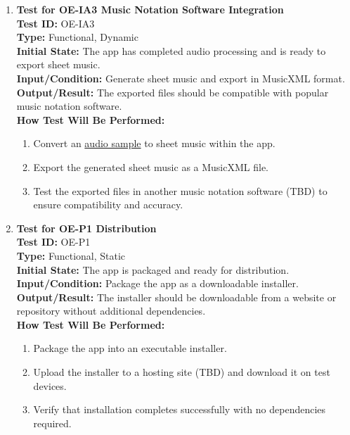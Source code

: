 \documentclass[12pt, titlepage]{article}
\begin{document}
\begin{enumerate}
    \item \textbf{Test for OE-IA3 Music Notation Software Integration} \\
      \newline
      \textbf{Test ID:} OE-IA3 \\
      \textbf{Type:} Functional, Dynamic \\
      \textbf{Initial State:} The app has completed audio processing and is ready to export sheet music. \\
      \textbf{Input/Condition:} Generate sheet music and export in MusicXML format. \\
      \textbf{Output/Result:} The exported files should be compatible with popular music notation software. \\
      \textbf{How Test Will Be Performed:}
      \begin{enumerate}
          \item Convert an \href{https://github.com/emilyperica/ScoreGen/tree/main/test/TestingDatasets/piano-samples/sample-songs}{audio sample} to sheet music within the app.
          \item Export the generated sheet music as a MusicXML file.
          \item Test the exported files in another music notation software (TBD) to ensure compatibility and accuracy.
      \end{enumerate}

    \item \textbf{Test for OE-P1 Distribution} \\
      \newline
      \textbf{Test ID:} OE-P1 \\
      \textbf{Type:} Functional, Static \\
      \textbf{Initial State:} The app is packaged and ready for distribution. \\
      \textbf{Input/Condition:} Package the app as a downloadable installer. \\
      \textbf{Output/Result:} The installer should be downloadable from a website or repository without additional dependencies. \\
      \textbf{How Test Will Be Performed:}
      \begin{enumerate}
          \item Package the app into an executable installer.
          \item Upload the installer to a hosting site (TBD) and download it on test devices.
          \item Verify that installation completes successfully with no dependencies required.
      \end{enumerate}


\end{enumerate}
\end{document}
